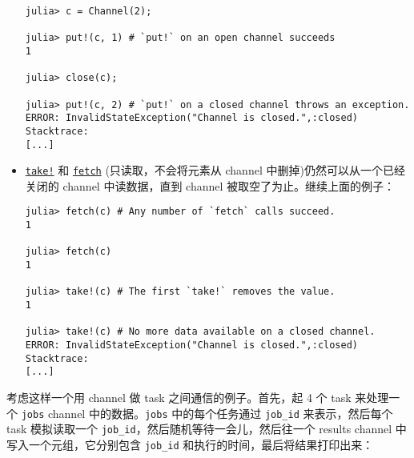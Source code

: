 \begin{itemize}
\begin{verbatim}
julia> c = Channel(2);

julia> put!(c, 1) # `put!` on an open channel succeeds
1

julia> close(c);

julia> put!(c, 2) # `put!` on a closed channel throws an exception.
ERROR: InvalidStateException("Channel is closed.",:closed)
Stacktrace:
[...]
\end{verbatim}


\item \hyperlink{4963355246106153560}{\texttt{take!}} 和 \hyperlink{11007884648860062495}{\texttt{fetch}} (只读取，不会将元素从 channel 中删掉)仍然可以从一个已经关闭的 channel 中读数据，直到 channel 被取空了为止。继续上面的例子：


\begin{verbatim}
julia> fetch(c) # Any number of `fetch` calls succeed.
1

julia> fetch(c)
1

julia> take!(c) # The first `take!` removes the value.
1

julia> take!(c) # No more data available on a closed channel.
ERROR: InvalidStateException("Channel is closed.",:closed)
Stacktrace:
[...]
\end{verbatim}

\end{itemize}


考虑这样一个用 channel 做 task 之间通信的例子。首先，起 4 个 task 来处理一个 \texttt{jobs} channel 中的数据。\texttt{jobs} 中的每个任务通过 \texttt{job\_id} 来表示，然后每个 task 模拟读取一个 \texttt{job\_id}，然后随机等待一会儿，然后往一个 results channel 中写入一个元组，它分别包含 \texttt{job\_id} 和执行的时间，最后将结果打印出来：




